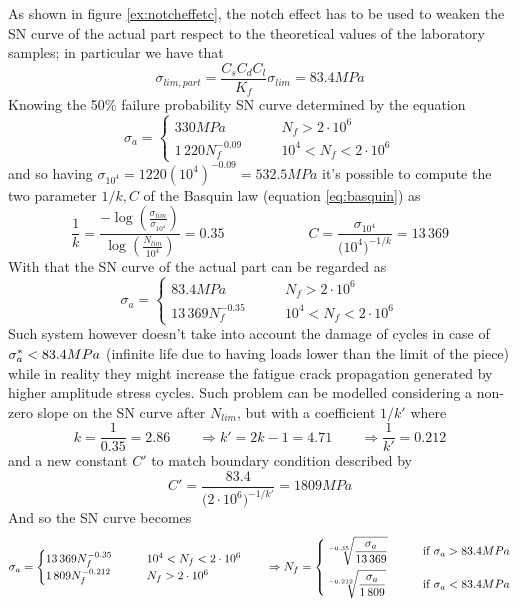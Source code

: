 	As shown in figure \ref{ex:notcheffetc}, the notch effect has to be used to weaken the SN curve of the actual part respect to the theoretical values of the laboratory samples; in particular we have that
	\[ \sigma_{lim,part} = \frac{C_sC_dC_l}{K_f} \sigma_{lim} = 83.4 MPa \]
	Knowing the 50\% failure probability SN curve determined by the equation	
	\[ \sigma_a = \begin{cases}
		330MPa &  N_f > 2\cdot 10^6 \\
		1\,220 N_f^{-0.09} \qquad & 10^4 < N_f < 2\cdot 10^6
	\end{cases} \]
	and so having $\sigma_{10^4} = 1220 (10^4)^{-0.09} = 532.5MPa$ it's possible to compute the two parameter $1/k,C$ of the Basquin law (equation \ref{eq:basquin}) as
	\[\frac 1 k = \frac{-\log \left( \frac{\sigma_{lim}}{\sigma_{10^4}} \right)}{\log\left( \frac{N_{lim}}{10^4} \right)} = 0.35 \qquad \qquad \qquad C = \frac{\sigma_{10^4}}{\big(10^4\big)^{-1/k} } = 13\,369\]
	With that the SN curve of the actual part can be regarded as
	\[ \sigma_a = \begin{cases}
		83.4 MPa &  N_f > 2\cdot 10^6 \\
		13\,369 N_f^{-0.35} \qquad & 10^4 < N_f < 2\cdot 10^6
	\end{cases} \]
	Such system however doesn't take into account the damage of cycles in case of $\sigma_{a}^* < 83.4MPa$ (infinite life due to having loads lower than the limit of the piece) while in reality they might increase the fatigue crack propagation generated by higher amplitude stress cycles. Such problem can be modelled considering a non-zero slope on the SN curve after $N_{lim}$, but with a coefficient $1/k'$ where
	\[ k = \frac 1{0.35} = 2.86 \qquad \Rightarrow k' = 2k-1=4.71 \qquad \Rightarrow \frac 1 {k'} = 0.212 \]	
	and a new constant $C'$ to match boundary condition described by
	\[ C' = \frac{83.4}{\big( 2\cdot 10^6\big)^{-1/k'}} = 1809 MPa \]
	And so the SN curve becomes
	\[ \sigma_a = \begin{cases}
		13\,369 N_f^{-0.35} \qquad & 10^4 < N_f < 2\cdot 10^6 \\
		1\,809 N_f^{-0.212} &  N_f > 2\cdot 10^6 
	\end{cases} \qquad \Rightarrow N_f = \left\{\begin{aligned}
		& \sqrt[-0.35]{\frac{\sigma_{a}}{13\,369}} \qquad &&  \textrm{if } \sigma_{a} >83.4MPa \\
		& \sqrt[-0.212]{\frac{\sigma_{a}}{1\,809}} \qquad &&  \textrm{if } \sigma_{a} < 83.4MPa \\		
	\end{aligned}\right.\]
